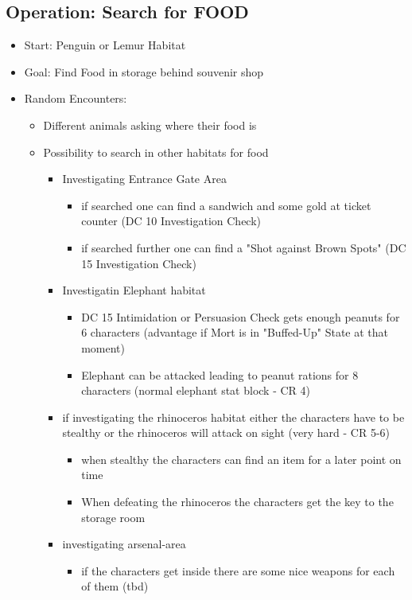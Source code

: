 \subsection*{Operation: Search for FOOD}
\begin{itemize}
	\item Start: Penguin or Lemur Habitat
	\item Goal: Find Food in storage behind souvenir shop
	\item Random Encounters:
	\begin{itemize}
		\item Different animals asking where their food is
		\item Possibility to search in other habitats for food
		\begin{itemize}
			\item Investigating Entrance Gate Area
			\begin{itemize}
				\item if searched one can find a sandwich and some gold at ticket counter (DC 10 Investigation Check)
				\item if searched further one can find a "Shot against Brown Spots" (DC 15 Investigation Check)
			\end{itemize}
			\item Investigatin Elephant habitat
			\begin{itemize}
				\item DC 15 Intimidation or Persuasion Check gets enough peanuts for 6 characters (advantage if Mort is in "Buffed-Up" State at that moment)
				\item Elephant can be attacked leading to peanut rations for 8 characters (normal elephant stat block - CR 4)
			\end{itemize}
			\item if investigating the rhinoceros habitat either the characters have to be stealthy or the rhinoceros will attack on sight (very hard - CR 5-6)
			\begin{itemize}
				\item when stealthy the characters can find an item for a later point on time
				\item When defeating the rhinoceros the characters get the key to the storage room
			\end{itemize}
			\item investigating arsenal-area
			\begin{itemize}
				\item if the characters get inside there are some nice weapons for each of them (tbd)

\end{itemize}
\end{itemize}
\end{itemize}
\end{itemize}

